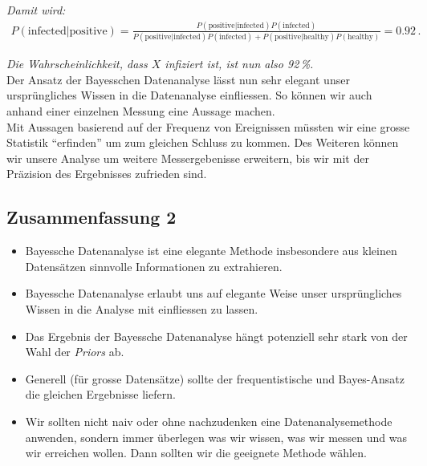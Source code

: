 \textit{Damit wird:}
\begin{align}
P( \text{infected$|$positive} ) =  \frac{ P( \text{positive$|$infected} ) P( \text{infected} ) }{ P( \text{positive$|$infected} ) P( \text{infected} ) + P( \text{positive$|$healthy} ) P( \text{healthy} ) } = 0.92\,.
\label{eq:vl4-40}
\end{align}

\textit{Die Wahrscheinlichkeit, dass $X$ infiziert ist, ist nun also 92\,\%.}\\[0.3cm]
Der Ansatz der Bayesschen Datenanalyse l\"asst nun sehr elegant unser urspr\"ungliches Wissen in die Datenanalyse einfliessen. So k\"onnen wir auch anhand einer einzelnen Messung eine Aussage machen.\\
Mit Aussagen basierend auf der Frequenz von Ereignissen m\"ussten wir eine grosse Statistik ``erfinden'' um zum gleichen Schluss zu kommen. Des Weiteren k\"onnen wir unsere Analyse um weitere Messergebenisse erweitern, bis wir mit der Pr\"azision des Ergebnisses zufrieden sind.


\subsection{Zusammenfassung 2}
\label{subsec:vl4-11}

\begin{itemize}
    \setlength\itemsep{0em}
        \item Bayessche Datenanalyse ist eine elegante Methode insbesondere aus kleinen Datens\"atzen sinnvolle Informationen zu extrahieren.
        \item Bayessche Datenanalyse erlaubt uns auf elegante Weise unser urspr\"ungliches Wissen in die Analyse mit einfliessen zu lassen.
        \item Das Ergebnis der Bayessche Datenanalyse h\"angt potenziell sehr stark von der Wahl der \textit{Priors} ab.
        \item Generell (f\"ur grosse Datens\"atze) sollte der frequentistische und Bayes-Ansatz die gleichen Ergebnisse liefern.
        \item Wir sollten nicht naiv oder ohne nachzudenken eine Datenanalysemethode anwenden, sondern immer \"uberlegen was wir wissen, was wir messen und was wir erreichen wollen. Dann sollten wir die geeignete Methode w\"ahlen.
\end{itemize}

